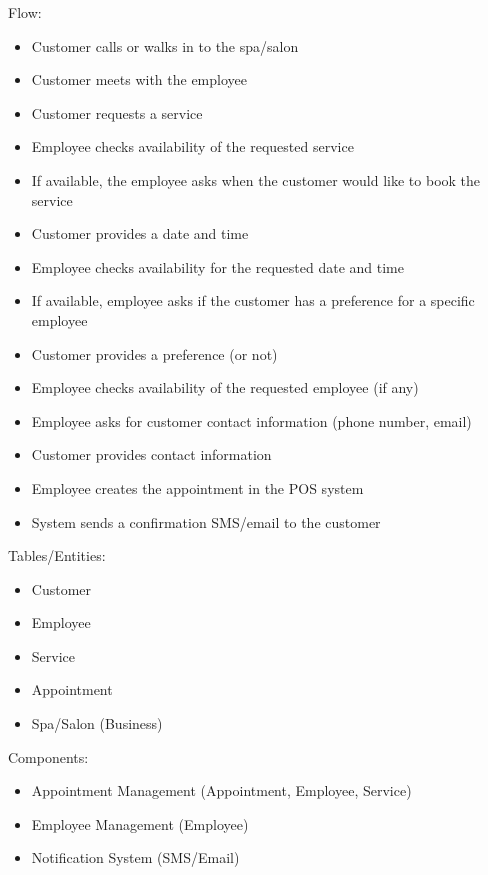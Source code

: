 \documentclass[]{VUMIFTemplateClass}
\begin{document}
Flow:
\begin{itemize}
    \setlength{\itemsep}{2pt}
    \setlength{\parskip}{0pt}
    \setlength{\parsep}{0pt}
    \item Customer calls or walks in to the spa/salon
    \item Customer meets with the employee
    \item Customer requests a service
    \item Employee checks availability of the requested service
    \item If available, the employee asks when the customer would like to book the service
    \item Customer provides a date and time
    \item Employee checks availability for the requested date and time
    \item If available, employee asks if the customer has a preference for a specific employee
    \item Customer provides a preference (or not)
    \item Employee checks availability of the requested employee (if any)
    \item Employee asks for customer contact information (phone number, email)
    \item Customer provides contact information
    \item Employee creates the appointment in the POS system
    \item System sends a confirmation SMS/email to the customer
\end{itemize}

Tables/Entities:
\begin{itemize}
    \setlength{\itemsep}{2pt}
    \setlength{\parskip}{0pt}
    \setlength{\parsep}{0pt}
    \item Customer
    \item Employee
    \item Service
    \item Appointment
    \item Spa/Salon (Business)
\end{itemize}

Components:
\begin{itemize}
    \setlength{\itemsep}{2pt}
    \setlength{\parskip}{0pt}
    \setlength{\parsep}{0pt}
    \item Appointment Management (Appointment, Employee, Service)
    \item Employee Management (Employee)
    \item Notification System (SMS/Email)
\end{itemize}
\end{document}
